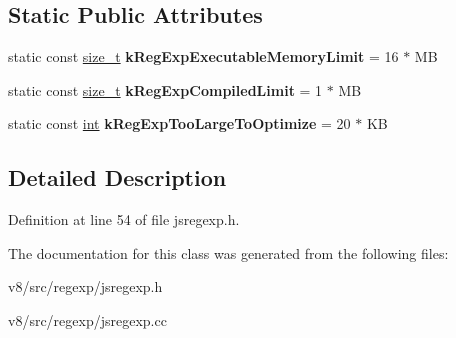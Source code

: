\subsection*{Static Public Attributes}
\begin{DoxyCompactItemize}
\item 
\mbox{\label{classv8_1_1internal_1_1RegExpImpl_ad47c3205517caf6da0aa39f7f542d5cf}} 
static const \mbox{\hyperlink{classsize__t}{size\+\_\+t}} {\bfseries k\+Reg\+Exp\+Executable\+Memory\+Limit} = 16 $\ast$ MB
\item 
\mbox{\label{classv8_1_1internal_1_1RegExpImpl_a94cd6bcbdeee12c03c0e753c681c9fe0}} 
static const \mbox{\hyperlink{classsize__t}{size\+\_\+t}} {\bfseries k\+Reg\+Exp\+Compiled\+Limit} = 1 $\ast$ MB
\item 
\mbox{\label{classv8_1_1internal_1_1RegExpImpl_af0ef2050306fce6dc564448ac4bd5124}} 
static const \mbox{\hyperlink{classint}{int}} {\bfseries k\+Reg\+Exp\+Too\+Large\+To\+Optimize} = 20 $\ast$ KB
\end{DoxyCompactItemize}


\subsection{Detailed Description}


Definition at line 54 of file jsregexp.\+h.



The documentation for this class was generated from the following files\+:\begin{DoxyCompactItemize}
\item 
v8/src/regexp/jsregexp.\+h\item 
v8/src/regexp/jsregexp.\+cc\end{DoxyCompactItemize}
